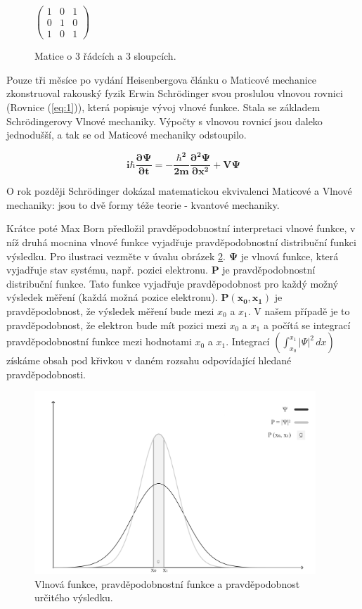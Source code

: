 \begin{figure}[ht]
    \centering
    $\begin{pmatrix}
    1 & 0 & 1 \\
    0 & 1 & 0 \\
    1 & 0 & 1
    \end{pmatrix}
    $
    \caption{\label{fig:1}Matice o 3 řádcích a 3 sloupcích.}
\end{figure}

Pouze tři měsíce po vydání Heisenbergova článku o Maticové mechanice zkonstruoval rakouský fyzik Erwin Schrödinger svou proslulou vlnovou rovnici (Rovnice (\ref{eq:1})), která popisuje vývoj vlnové funkce. Stala se základem Schrödingerovy Vlnové mechaniky. Výpočty s vlnovou rovnicí jsou daleko jednodušší, a tak se od Maticové mechaniky odstoupilo.

\begin{equation}
    \bm{i\hbar \frac{\partial \Psi}{\partial t} = -\frac{\hbar^2}{2m}
    \frac{\partial^2 \Psi}{\partial x^2} + V \Psi}
    \label{eq:1}
\end{equation}

O rok později Schrödinger dokázal matematickou ekvivalenci Maticové a Vlnové mechaniky: jsou to dvě formy téže teorie - kvantové mechaniky.

Krátce poté Max Born předložil pravděpodobnostní interpretaci vlnové funkce, v níž druhá mocnina vlnové funkce vyjadřuje pravděpodobnostní distribuční funkci výsledku. Pro ilustraci vezměte v úvahu obrázek \ref{fig:2}. $\bm{\Psi}$ je vlnová funkce, která vyjadřuje stav systému, např. pozici elektronu. \textbf{P} je pravděpodobnostní distribuční funkce. Tato funkce vyjadřuje pravděpodobnost pro každý možný výsledek měření (každá možná pozice elektronu). $\bm{P(x_0,x_1)}$ je pravděpodobnost, že výsledek měření bude mezi $x_0$ a $x_1$. V našem případě je to pravděpodobnost, že elektron bude mít pozici mezi $x_0$ a $x_1$ a počítá se integrací pravděpodobnost\-ní funkce mezi hodnotami $x_0$ a $x_1$. Integrací $(\int_{x_0}^{x_1}|\Psi|^2\,dx)$ získáme obsah pod křivkou v daném rozsahu odpovídající hledané pravděpodobnosti. 


\clearpage

\begin{figure}[ht]
\centering
\includegraphics[width=300pt]{images/probability-function.png}
\caption{\label{fig:2}Vlnová funkce, pravděpodobnostní funkce a pravděpodobnost určitého výsledku.}
\end{figure}



